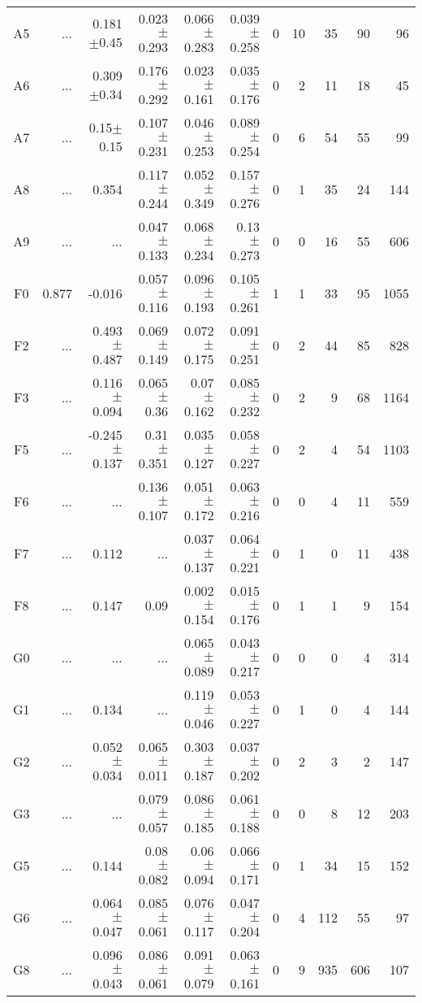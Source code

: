 \begin{table}[t]
\begin{table}[t]
\begin{center}
\begin{tabular}{c|rrrrr|rrrrr}
    A5	&	 ...	&	0.181$\pm$0.45	&	0.023$\pm$0.293	&	0.066$\pm$0.283	&	0.039$\pm$0.258	&	0	&	10	&	35	&	90	&	96	\\
    A6	&	 ...	&	0.309$\pm$0.34	&	0.176$\pm$0.292	&	0.023$\pm$0.161	&	0.035$\pm$0.176	&	0	&	2	&	11	&	18	&	45	\\
    A7	&	 ...	&	0.15$\pm$0.15	&	0.107$\pm$0.231	&	0.046$\pm$0.253	&	0.089$\pm$0.254	&	0	&	6	&	54	&	55	&	99	\\
    A8	&	 ...	&	0.354	&	0.117$\pm$0.244	&	0.052$\pm$0.349	&	0.157$\pm$0.276	&	0	&	1	&	35	&	24	&	144	\\
    A9	&	 ...	&	 ...	&	0.047$\pm$0.133	&	0.068$\pm$0.234	&	0.13$\pm$0.273	&	0	&	0	&	16	&	55	&	606	\\
    F0	&	0.877	&	-0.016	&	0.057$\pm$0.116	&	0.096$\pm$0.193	&	0.105$\pm$0.261	&	1	&	1	&	33	&	95	&	1055	\\
    F2	&	 ...	&	0.493$\pm$0.487	&	0.069$\pm$0.149	&	0.072$\pm$0.175	&	0.091$\pm$0.251	&	0	&	2	&	44	&	85	&	828	\\
    F3	&	 ...	&	0.116$\pm$0.094	&	0.065$\pm$0.36	&	0.07$\pm$0.162	&	0.085$\pm$0.232	&	0	&	2	&	9	&	68	&	1164	\\
    F5	&	 ...	&	-0.245$\pm$0.137	&	0.31$\pm$0.351	&	0.035$\pm$0.127	&	0.058$\pm$0.227	&	0	&	2	&	4	&	54	&	1103	\\
    F6	&	 ...	&	 ...	&	0.136$\pm$0.107	&	0.051$\pm$0.172	&	0.063$\pm$0.216	&	0	&	0	&	4	&	11	&	559	\\
    F7	&	 ...	&	0.112	&	 ...	&	0.037$\pm$0.137	&	0.064$\pm$0.221	&	0	&	1	&	0	&	11	&	438	\\
    F8	&	 ...	&	0.147	&	0.09	&	0.002$\pm$0.154	&	0.015$\pm$0.176	&	0	&	1	&	1	&	9	&	154	\\
    G0	&	 ...	&	 ...	&	 ...	&	0.065$\pm$0.089	&	0.043$\pm$0.217	&	0	&	0	&	0	&	4	&	314	\\
    G1	&	 ...	&	0.134	&	 ...	&	0.119$\pm$0.046	&	0.053$\pm$0.227	&	0	&	1	&	0	&	4	&	144	\\
    G2	&	 ...	&	0.052$\pm$0.034	&	0.065$\pm$0.011	&	0.303$\pm$0.187	&	0.037$\pm$0.202	&	0	&	2	&	3	&	2	&	147	\\
    G3	&	 ...	&	 ...	&	0.079$\pm$0.057	&	0.086$\pm$0.185	&	0.061$\pm$0.188	&	0	&	0	&	8	&	12	&	203	\\
    G5	&	 ...	&	0.144	&	0.08$\pm$0.082	&	0.06$\pm$0.094	&	0.066$\pm$0.171	&	0	&	1	&	34	&	15	&	152	\\
    G6	&	 ...	&	0.064$\pm$0.047	&	0.085$\pm$0.061	&	0.076$\pm$0.117	&	0.047$\pm$0.204	&	0	&	4	&	112	&	55	&	97	\\
    G8	&	 ...	&	0.096$\pm$0.043	&	0.086$\pm$0.061	&	0.091$\pm$0.079	&	0.063$\pm$0.161	&	0	&	9	&	935	&	606	&	107	\\

\end{tabular}
\end{center}
\end{table}
\end{table}
